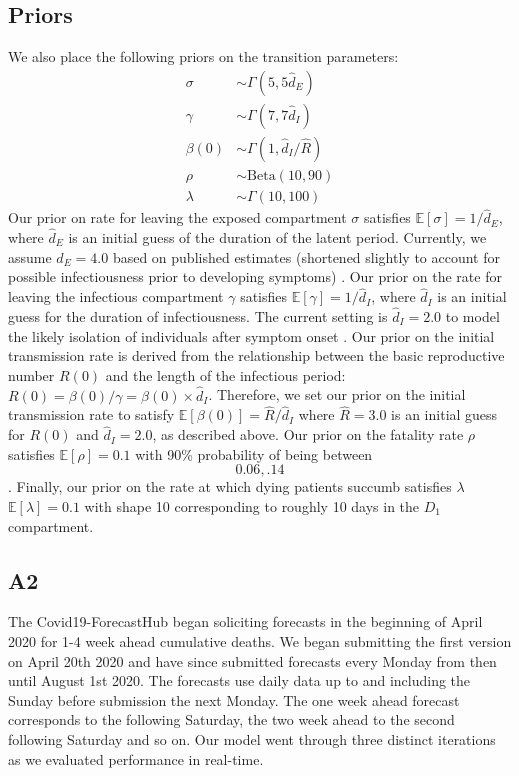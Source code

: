\documentclass[11pt]{amsart}
\newcommand{\Beta}{\text{Beta}}
\newcommand{\E}{\mathbb{E}}
\begin{document}
  \subsection{Priors}
We also place the following priors on the transition parameters: 
\begin{align*}
\sigma &\sim \Gamma(5, 5 \hat{d}_E)\\
\gamma & \sim \Gamma(7, 7 \hat{d}_I) \\
\beta(0) &\sim \Gamma(1, \hat{d}_I/\hat{R}) \\
    \rho &\sim \Beta(10, 90)\\ 
\lambda &\sim \Gamma(10, 100)
\end{align*}
 Our prior on rate for leaving the exposed compartment $\sigma$ satisfies $\E[\sigma] = 1/\hat{d}_E$, where $\hat{d}_E$ is an initial guess of the duration of the latent period. Currently, we assume $\hat{d}_E = 4.0$ based on published estimates (shortened slightly to account for possible infectiousness prior to developing symptoms) \cite{midas}.
 Our prior on the rate for leaving the infectious compartment $\gamma$ satisfies $\E[\gamma] = 1/\hat{d}_I$, where $\hat{d}_I$ is an initial guess for the duration of infectiousness. The current setting is $\hat{d}_I = 2.0$ to model the likely isolation of individuals after symptom onset \cite{heffner2020emotional}. 
Our prior on the initial transmission rate is derived from the relationship between the basic reproductive number $R(0)$ and the length of the infectious period: $R(0) = \beta(0)/\gamma = \beta(0)\times \hat{d}_I$. Therefore, we set our prior on the initial transmission rate to satisfy $\E[\beta(0)] = \hat{R}/\hat{d}_I$ where $\hat{R} = 3.0$ is an initial guess for $R(0)$ and $\hat{d}_I = 2.0$, as described above. 
Our prior on the fatality rate $\rho$ satisfies $\E[\rho] = 0.1$ with 90\% probability of being between \[0.06,.14\].
Finally, our prior on the rate at which dying patients succumb  satisfies $\lambda$ $\E[\lambda] = 0.1$ with shape 10 corresponding to roughly 10 days in the $D_{1}$ compartment.

\subsection{A2}

 
The Covid19-ForecastHub began soliciting forecasts in the beginning of April 2020 for 1-4 week ahead cumulative deaths. We began submitting the first version on April 20th 2020 and have since submitted forecasts every Monday from then until August 1st 2020. The forecasts use daily data up to and including the Sunday before submission the next Monday. The one week ahead forecast corresponds to the following Saturday, the two week ahead to the second following Saturday and so on. Our model went through three distinct iterations as we evaluated performance in real-time. 
 
\end{document}
